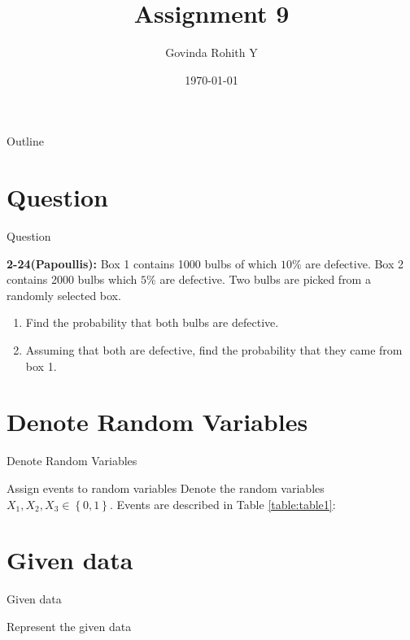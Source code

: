 \documentclass{beamer}
\title{Assignment 9}
\author{Govinda Rohith Y}
\date{\today}
\providecommand{\cbrak}[1]{\ensuremath{\left\{#1\right\}}}
\begin{document}
\begin{frame}
    \titlepage 
\end{frame}

\logo{}


\begin{frame}{Outline}
    \tableofcontents
\end{frame}


\section{Question}
\begin{frame}{Question}

\begin{block}{\textbf{2-24(Papoullis):}}
        Box 1 contains 1000 bulbs of which $10\%$ are defective. Box 2 contains 2000 bulbs which $5\%$ are defective. Two bulbs are picked from a randomly selected box.
\begin{enumerate}[label=(\alph*)]
    \item Find the probability that both bulbs are defective.
    \item Assuming that both are defective, find the probability that they came from box 1.
\end{enumerate}
    \end{block}

\end{frame}


\section{Denote Random Variables}
\begin{frame}{Denote Random Variables}
    \begin{block}{Assign events to random variables}
   Denote the random variables $X_1,X_2,X_3\in \cbrak{0,1}$. Events are described in Table \ref{table:table1}:
    \end{block}
    \begin{table}[h!]
	
	\caption{}
    \label{table:table1}
    \end{table}
     
     \end{frame} 
     \section{Given data}
     \begin{frame}{Given data}
\begin{block}{Represent the given data}

\end{block}
\begin{table}[h!]
	
	\caption{}
    \label{table:table2}
    \end{table}
\end{frame} 
\end{document}
